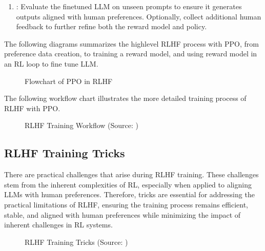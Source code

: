 \documentclass[letterpaper,11pt,english]{sphinxmanual}
\begin{document}
\begin{enumerate}
\begin{enumerate}
\end{enumerate}

\item {} 
\sphinxAtStartPar
{}: Evaluate the fine\sphinxhyphen{}tuned LLM on unseen prompts to
ensure it generates outputs aligned with human preferences.
Optionally, collect additional human feedback to further refine both
the reward model and policy.

\end{enumerate}

\sphinxAtStartPar
The following diagrams summarizes the high\sphinxhyphen{}level RLHF process with PPO,
from preference data creation, to training a reward model, and using
reward model in an RL loop to fine tune LLM.

\begin{figure}[htbp]
\centering
\capstart

\noindent{}
\caption{Flowchart of PPO in RLHF}\label{\detokenize{rlhf:id8}}\end{figure}

\sphinxAtStartPar
The following workflow chart illustrates the more detailed training
process of RLHF with PPO. 

\begin{figure}[htbp]
\centering
\capstart

\noindent{}
\caption{RLHF Training Workflow (Source: )}\label{\detokenize{rlhf:id9}}\end{figure}


\subsection{RLHF Training Tricks}
\label{\detokenize{rlhf:rlhf-training-tricks}}
\sphinxAtStartPar
There are practical challenges that arise during RLHF training. These
challenges stem from the inherent complexities of RL, especially when
applied to aligning LLMs with human preferences. Therefore, tricks are
essential for addressing the practical limitations of RLHF, ensuring the
training process remains efficient, stable, and aligned with human
preferences while minimizing the impact of inherent challenges in RL
systems.

\begin{figure}[htbp]
\centering
\capstart

\noindent{}
\caption{RLHF Training Tricks (Source: )}\label{\detokenize{rlhf:id10}}\end{figure}
\end{document}
